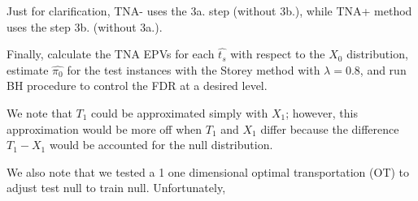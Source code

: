 \documentclass{article}
\begin{document}
	Just for clarification, TNA- uses the 3a. step (without 3b.), while TNA+ method uses the step 3b. (without 3a.).
	
	Finally, calculate the TNA EPVs for each $\hat{t_s}$ with respect to the $X_0$ distribution, estimate  $\hat{\pi_0}$ for the test instances with the Storey method with $\lambda= 0.8$, and run BH procedure to control the FDR at a desired level. 
	
	We note that $T_1$ could be approximated simply with $X_1$; however, this approximation would be more off when $T_1$ and $X_1$ differ because the difference $T_1-X_1$ would be accounted for the null distribution.
	
	We also note that we tested a 1 one dimensional optimal transportation (OT) to adjust test null to train null. Unfortunately, 
	
	
	
%	
%	
	
\end{document}
